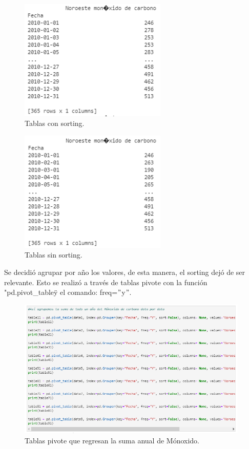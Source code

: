 \documentclass[12pt]{article}
\begin{document}
         \begin{figure}[h!] 
          \centering 
            \includegraphics[width=7cm]{Pred4_1.png}
                \caption{Tablas con sorting.}
                \label{fig:5}
                 \end{figure} 
            
         \begin{figure}[h!] 
          \centering 
            \includegraphics[width=7cm]{Pred4_2.png}
                \caption{Tablas sin sorting.}
                \label{fig:6}
                 \end{figure} 
             
    Se decidió agrupar por año los valores, de esta manera, el sorting dejó de ser relevante. Esto se realizó a través de tablas pivote con la función "pd.pivot\_table\" y el comando: freq=$"$y$"$. 
         \begin{figure}[h!] 
          \centering 
            \includegraphics[width=11cm]{Pred5.png}
                \caption{Tablas pivote que regresan la suma anual de Mónoxido.}
                \label{fig:7}
                 \end{figure}      
     
\end{document}
